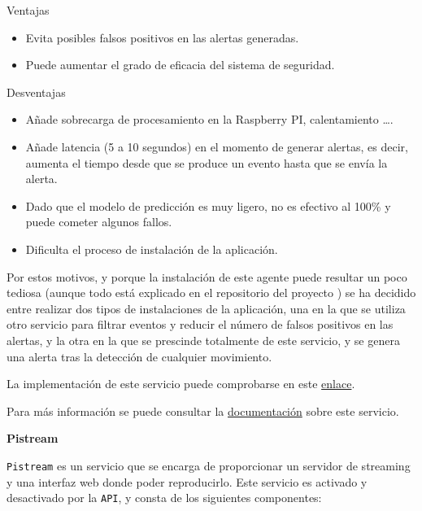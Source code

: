 Ventajas

\begin{itemize}

\vspace{-0.5cm}

\item Evita posibles falsos positivos en las alertas generadas.
\item Puede aumentar el grado de eficacia del sistema de seguridad.
\end{itemize}

Desventajas

\vspace{-0.5cm}

\begin{itemize}
\item Añade sobrecarga de procesamiento en la Raspberry PI, calentamiento \ldots.
\item Añade latencia (5 a 10 segundos) en el momento de generar alertas, es decir, aumenta el tiempo desde que se produce un evento hasta que se envía la alerta.
\item Dado que el modelo de predicción es muy ligero, no es efectivo al 100\% y puede cometer algunos fallos.
\item Dificulta el proceso de instalación de la aplicación.
\end{itemize}

Por estos motivos, y porque la instalación de este agente puede resultar un poco tediosa (aunque todo está explicado en el repositorio del proyecto \cite{ref1}) se ha decidido entre realizar dos tipos de instalaciones de la aplicación, una en la que se utiliza otro servicio para filtrar eventos y reducir el número de falsos positivos en las alertas, y la otra en la que se prescinde totalmente de este servicio, y se genera una alerta tras la detección de cualquier movimiento.

La implementación de este servicio puede comprobarse en este \href{https://github.com/jmv74211/TFM_security_system_PI/blob/master/src/agents/object_detector_agent.py}{enlace}.

Para más información se puede consultar la \href{https://github.com/jmv74211/TFM_security_system_PI/blob/master/doc/api/object_detector_agent_doc.md}{documentación} sobre este servicio.

\textbf{Pistream}

\texttt{Pistream} es un servicio que se encarga de proporcionar un servidor de streaming y una interfaz web donde poder reproducirlo. Este servicio es activado y desactivado por la \texttt{API}, y consta de los siguientes componentes:

